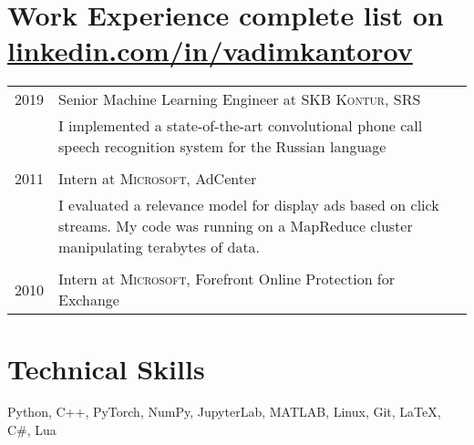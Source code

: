 \documentclass[a4paper,10pt]{article}
\begin{document}
\section{Work Experience \texorpdfstring{\hfill \footnotesize{complete list on \href{http://linkedin.com/in/vadimkantorov}{linkedin.com/in/vadimkantorov}}}{}}
\begin{tabular}{lp{11cm}}
    2019\phantom{+} & Senior Machine Learning Engineer at \textsc{SKB Kontur}, SRS\\
    & \footnotesize{I implemented a state-of-the-art convolutional phone call speech recognition system for the Russian language}\\
    
    \\2011 & Intern at \textsc{Microsoft}, AdCenter\\
    & \footnotesize{I evaluated a relevance model for display ads based on click streams. My code was running on a MapReduce cluster manipulating terabytes of data.}\\
    
    \\2010 & Intern at \textsc{Microsoft}, Forefront Online Protection for Exchange\\

\end{tabular}

\section{Technical Skills}
Python, C++, PyTorch, NumPy, JupyterLab, MATLAB, Linux, Git, LaTeX, C\#, Lua

\end{document}
